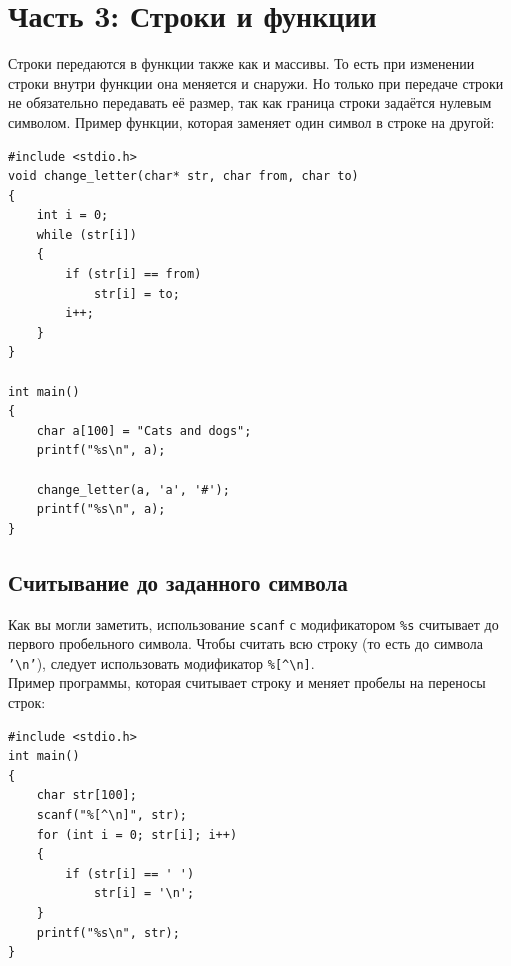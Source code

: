 \documentclass{article}
\begin{document}
\newpage
\section*{Часть 3: Строки и функции}
Строки передаются в функции также как и массивы. То есть при изменении строки внутри функции она меняется и снаружи. Но только при передаче строки не обязательно передавать её размер, так как граница строки задаётся нулевым символом. Пример функции, которая заменяет один символ в строке на другой:
\begin{lstlisting}
#include <stdio.h>
void change_letter(char* str, char from, char to) 
{
    int i = 0;
    while (str[i]) 
    {
        if (str[i] == from) 
            str[i] = to;
        i++;
    }
}

int main() 
{
    char a[100] = "Cats and dogs";
    printf("%s\n", a);
    
    change_letter(a, 'a', '#');
    printf("%s\n", a);
}
\end{lstlisting}

\subsection*{Считывание до заданного символа}
Как вы могли заметить, использование \texttt{scanf} с модификатором \texttt{\%s} считывает до первого пробельного символа. Чтобы считать всю строку (то есть до символа \texttt{'\textbackslash n'}), следует использовать модификатор \verb|%[^\n]|. \\
Пример программы, которая считывает строку и меняет пробелы на переносы строк:
\begin{lstlisting}
#include <stdio.h>
int main() 
{
    char str[100];
    scanf("%[^\n]", str);
    for (int i = 0; str[i]; i++)
    {
        if (str[i] == ' ') 
            str[i] = '\n';
    }
    printf("%s\n", str);
}
\end{lstlisting}


\newpage
\end{document}
